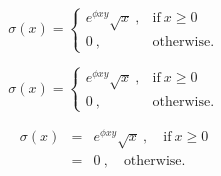 \documentclass[a4paper]{article}
\begin{document}
    \begin{equation}
    \sigma(x) = \begin{cases}
    e^{\phi xy} \sqrt{x}~,
    & \text{if} ~x\geq 0\\
    0~, & \text{otherwise.}
    \end{cases}
    \end{equation}

    \begin{equation}
        \sigma(x) = \left\{\begin{array}{rl}
        e^{\phi xy} \sqrt{x}~,
        & \text{if}~ x\geq 0\\
        0~, & \text{otherwise.}
        \end{array}\right.
    \end{equation}
    
    \begin{eqnarray}
        \sigma(x) &=& e^{\phi xy} \sqrt{x}~,\quad
        \text{if}~ x\geq 0\\
        &=& 0~,\quad \text{otherwise.}
    \end{eqnarray}
\end{document}
